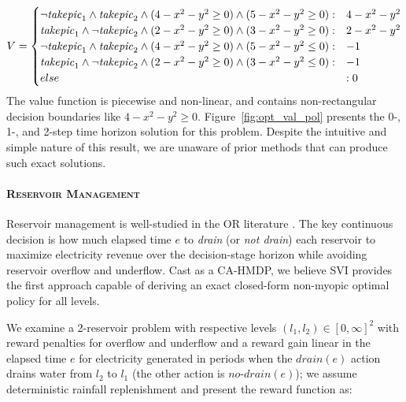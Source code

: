 \documentclass[twoside,11pt]{article}
\newcommand{\WaterReservoir}{\textsc{Reservoir Management }}
\begin{document}
{\footnotesize
\begin{align*}
V = \begin{cases}
\neg \mathit{take\-pic}_1 \land \mathit{take\-pic}_2 \land (4 -x^2 -y^2\geq 0) \land 
(5 - x^2 - y^2\geq 0) : & 4 -x^2 -y^2 \\
\mathit{take\-pic}_1 \land \neg \mathit{take\-pic}_2 \land (2 -x^2 -y^2\geq 0) \land 
(3 - x^2 - y^2\geq 0) : & 2 -x^2 -y^2 \\
\neg \mathit{take\-pic}_1 \land \mathit{take\-pic}_2 \land (4 -x^2 -y^2\geq 0) \land 
(5 - x^2 - y^2\leq 0) : & -1 \\
\mathit{take\-pic}_1 \land \neg \mathit{take\-pic}_2 \land (2 -x^2 -y^2\geq 0) \land 
(3 - x^2 - y^2\leq 0) : & -1 \\
else &: 0 \\
\end{cases} 
\end{align*}
}
The value function is piecewise and non-linear, and contains non-rectangular decision
boundaries like $4 -x^2 -y^2\geq 0$. Figure~\ref{fig:opt_val_pol} presents the  0-, 1-, and 2-step time horizon solution for this problem. Despite the intuitive and simple nature of this result, we are unaware of prior methods that can produce such exact solutions. 

\paragraph{\WaterReservoir} 
Reservoir management is well-studied in
the OR literature \cite{Mahootchi2009,Yeh1985}.  The key continuous decision is how
much elapsed time $e$ to
\emph{drain} (or \emph{not drain}) each reservoir to maximize
electricity revenue over the decision-stage horizon while avoiding
reservoir overflow and underflow.  Cast as a CA-HMDP, we 
believe SVI provides the first approach capable of deriving
an exact closed-form non-myopic optimal policy
for all levels.

We examine a 2-reservoir problem with
respective levels $(l_1,l_2)\in [0,\infty]^2$ with reward penalties for 
overflow and underflow and a reward gain linear in the elapsed time $e$ for
electricity generated in periods when the $\mathit{drain}(e)$ action
drains water from $l_2$ to $l_1$ (the other action is 
$\mathit{no}$-$\mathit{drain}(e)$); we assume deterministic rainfall
replenishment and present the reward function as:  
\end{document}
